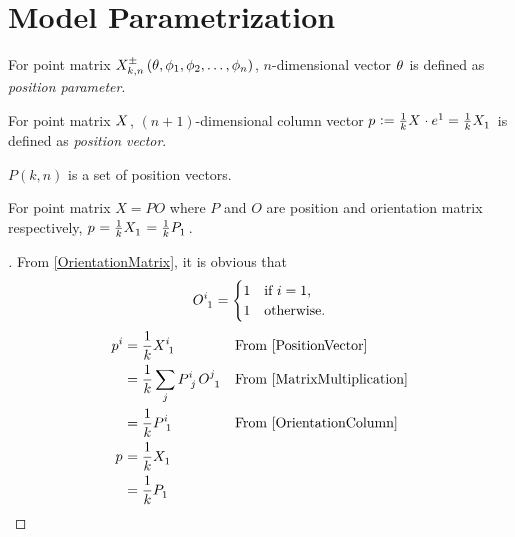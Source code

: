 \documentclass[stu, babel, american, biblatex, a4paper, draftall]{apa7}
\begin{document}
\section{Model Parametrization}
\begin{definition}\label{PositionParameter}
    For point matrix $\tensor{X^\pm_{k,n}\left(\theta,\phi_1,\phi_2,\dots,\phi_n\right)}{}$,
    $n$-dimensional vector $\tensor{\theta}{}$
    is defined as \textit{position parameter}.
\end{definition}
\begin{definition}\label{PositionVector}
    For point matrix $\tensor{X}{}$,
    $\left(n+1\right)$-dimensional column vector $\tensor{p}{}\defeq \frac{1}{k} \tensor{X}{}\cdot\tensor{e}{^1}=\frac{1}{k} \tensor{X}{_1}$
    is defined as \textit{position vector}.
\end{definition}
\begin{definition}\label{PositionVectorSet}
    $P\left(k,n\right)$ is a set of position vectors.
\end{definition}
\begin{lemma}\label{PositionVectorMatrix}
    For point matrix $X=PO$
    where $P$ and $O$ are position and orientation matrix respectively,
    $\tensor{p}{}=\frac{1}{k}\tensor{X}{_1}=\frac{1}{k}\tensor{P}{_1}$.
\end{lemma}
\begin{proof}[]
    From \cref{OrientationMatrix}, it is obvious that
    \begin{equation}\label{OrientationColumn}
        \tensor{O}{^i_1} =
        \begin{cases}
            1 & \text{if $i=1$,}  \\
            1 & \text{otherwise.} \\
        \end{cases}
    \end{equation}
    \begin{align*}
        \tensor{p}{^i}
         & = \frac{1}{k}\tensor{X}{^i_1}                         &  & \text{From \cref{PositionVector}}       \\
         & = \frac{1}{k}\sum_j{\tensor{P}{^i_j}\tensor{O}{^j_1}} &  & \text{From \cref{MatrixMultiplication}} \\
         & = \frac{1}{k}\tensor{P}{^i_1}                         &  & \text{From \cref{OrientationColumn}}    \\
        \tensor{p}{}
         & = \frac{1}{k}\tensor{X}{_1}                                                                        \\
         & = \frac{1}{k}\tensor{P}{_1}                           &  & \qedhere
    \end{align*}
\end{proof}
\end{document}
